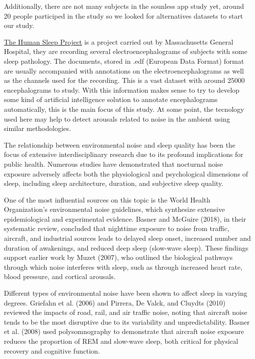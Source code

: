 Additionally, there are not many subjects in the sounless app study yet, around 20 people participed in the study so we looked for alternatives datasets to start our study.

\href{https://bdsp.io/content/hsp/2.0/}{The Human Sleep Project} is a project carried out by Massachusetts General Hospital, they are recording several electroencephalograms of subjects with some sleep pathology. The documents, stored in .edf (European Data Format) format are usually accompanied with annotations on the electroencephalograms as well as the channels used for the recording. This is a vast dataset with around 25000 encephalograms to study. With this information makes sense to try to develop some kind of artificial intelligence solution to annotate encephalograms automatically, this is the main focus of this study. At some point, the tecnology used here may help to detect arousals related to noise in the ambient using similar methodologies. 


The relationship between environmental noise and sleep quality has been the focus of extensive interdisciplinary research due to its profound implications for public health. Numerous studies have demonstrated that nocturnal noise exposure adversely affects both the physiological and psychological dimensions of sleep, including sleep architecture, duration, and subjective sleep quality.

One of the most influential sources on this topic is the World Health Organization's environmental noise guidelines, which synthesize extensive epidemiological and experimental evidence. Basner and McGuire (2018), in their systematic review, concluded that nighttime exposure to noise from traffic, aircraft, and industrial sources leads to delayed sleep onset, increased number and duration of awakenings, and reduced deep sleep (slow-wave sleep). These findings support earlier work by Muzet (2007), who outlined the biological pathways through which noise interferes with sleep, such as through increased heart rate, blood pressure, and cortical arousals.

Different types of environmental noise have been shown to affect sleep in varying degrees. Griefahn et al. (2006) and Pirrera, De Valck, and Cluydts (2010) reviewed the impacts of road, rail, and air traffic noise, noting that aircraft noise tends to be the most disruptive due to its variability and unpredictability. Basner et al. (2008) used polysomnography to demonstrate that aircraft noise exposure reduces the proportion of REM and slow-wave sleep, both critical for physical recovery and cognitive function.

